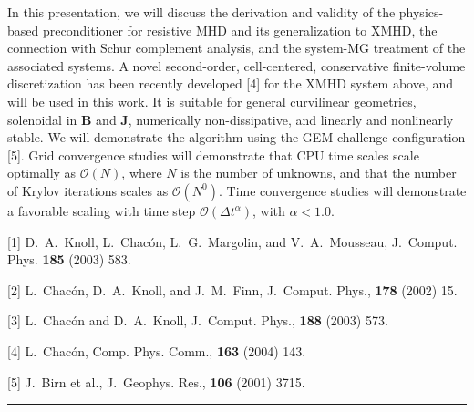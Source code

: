 \documentclass[twosided]{report}
\begin{document}
In this presentation, we
will discuss the derivation and validity of the
physics-based preconditioner for resistive MHD and its
generalization to XMHD, the connection with Schur complement
analysis, and the system-MG treatment of the associated
systems. A novel second-order, cell-centered, conservative
finite-volume discretization has been recently developed [4]
for the XMHD system above, and will be used
in this work. It is suitable for general curvilinear
geometries, solenoidal in $\mathbf{B}$ and $\mathbf{J}$,
numerically non-dissipative, and linearly and nonlinearly
stable. We will demonstrate the algorithm using the GEM
challenge configuration [5].
Grid convergence
studies will demonstrate that CPU time scales scale
optimally as $\mathcal{O}(N)$, where $N$ is the number of
unknowns, and that the number of Krylov iterations scales as
$\mathcal{O}(N^{0})$. Time convergence studies will
demonstrate a favorable scaling with time step
$\mathcal{O}(\Delta t^{\alpha })$, with $\alpha <1.0$.

[1] D.~A.~Knoll, L.~Chac\'{o}n, L.~G.~Margolin, and V.~A.~Mousseau,
J.~Comput. Phys. \textbf{185} (2003) 583.

[2] L.~Chac\'{o}n, D.~A.~Knoll, and J.~M.~Finn,
J.~Comput. Phys., \textbf{178} (2002) 15.

[3] L.~Chac\'{o}n and D.~A.~Knoll, J.~Comput. Phys.,
\textbf{188} (2003) 573.

[4] L.~Chac\'{o}n, Comp. Phys. Comm., \textbf{163} (2004) 143.

[5] J.~Birn et al.,
J.~Geophys. Res., \textbf{106} (2001) 3715.


	\begin{center} \rule{6in}{1pt} \end{center}
\end{document}
